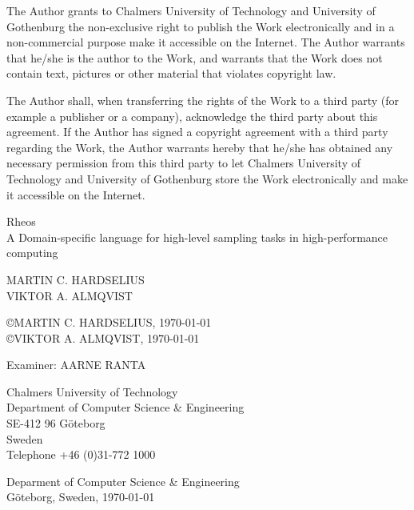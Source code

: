 \thispagestyle{empty}
The Author grants to Chalmers University of Technology and University
of Gothenburg the non-exclusive right to publish the Work
electronically and in a non-commercial purpose make it accessible on
the Internet.  The Author warrants that he/she is the author to the
Work, and warrants that the Work does not contain text, pictures or
other material that violates copyright law.

The Author shall, when transferring the rights of the Work to a third
party (for example a publisher or a company), acknowledge the third
party about this agreement. If the Author has signed a copyright
agreement with a third party regarding the Work, the Author warrants
hereby that he/she has obtained any necessary permission from this
third party to let Chalmers University of Technology and University of
Gothenburg store the Work electronically and make it accessible on the
Internet.

\vfill

\begin{flushleft}
Rheos\\
A Domain-specific language for high-level sampling tasks in
high-performance computing
\vspace{11pt}

MARTIN C. HARDSELIUS\\
VIKTOR A. ALMQVIST
\vspace{11pt}

\copyright{MARTIN C. HARDSELIUS}, \today \\
\copyright{VIKTOR A. ALMQVIST}, \today
\vspace{11pt}

Examiner: {AARNE RANTA}
\vspace{11pt}

Chalmers University of Technology\\
Department of Computer Science \& Engineering\\
SE-412 96 Göteborg\\
Sweden\\
Telephone +46 (0)31-772 1000
\vspace{66pt}

Deparment of Computer Science \& Engineering\\
Göteborg, Sweden, \today
\end{flushleft}
